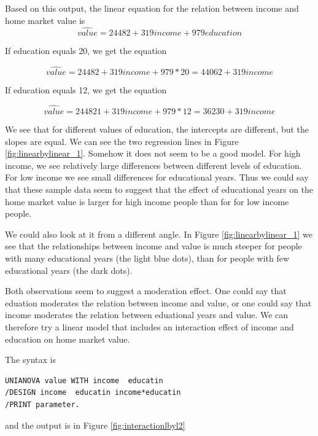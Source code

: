 \documentclass[]{report}\usepackage[]{graphicx}\usepackage[]{color}
\begin{document}
Based on this output, the linear equation for the relation between income and home market value is 
\begin{equation}
\widehat{value}= 24482 + 319 income + 979 education
\end{equation}

If education equals 20, we get the equation

\begin{equation}
\widehat{value}= 24482 + 319 income + 979 * 20 = 44062 + 319 income
\end{equation}

If education equals 12, we get the equation 

\begin{equation}
\widehat{value}= 244821 + 319 income + 979 * 12 = 36230 + 319 income
\end{equation}

We see that for different values of education, the intercepts are different, but the slopes are equal. We can see the two regression lines in Figure \ref{fig:linearbylinear_1}. Somehow it does not seem to be a good model. For high income, we see relatively large differences between different levels of education. For low income we see small differences for educational years. Thus we could say that these sample data seem to suggest that the effect of educational years on the home market value is larger for high income people than for for low income people.

We could also look at it from a different angle. In Figure \ref{fig:linearbylinear_1} we see that the relationships between income and value is much steeper for people with many educational years (the light blue dots), than for people with few educational years (the dark dots).

Both observations seem to suggest a moderation effect. One could say that eduation moderates the relation between income and value, or one could say that income moderates the relation between eduational years and value. We can therefore try a linear model that includes an interaction effect of income and education on home market value. 

The syntax is 

\begin{verbatim}
UNIANOVA value WITH income  educatin
/DESIGN income  educatin income*educatin
/PRINT parameter.
\end{verbatim}

and the output is in Figure \ref{fig:interactionlbyl2}
\end{document}
